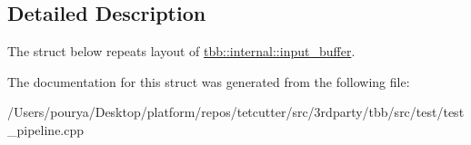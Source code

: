 \subsection{Detailed Description}
The struct below repeats layout of \hyperlink{classtbb_1_1internal_1_1input__buffer}{tbb\+::internal\+::input\+\_\+buffer}. 

The documentation for this struct was generated from the following file\+:\begin{DoxyCompactItemize}
\item 
/\+Users/pourya/\+Desktop/platform/repos/tetcutter/src/3rdparty/tbb/src/test/test\+\_\+pipeline.\+cpp\end{DoxyCompactItemize}
